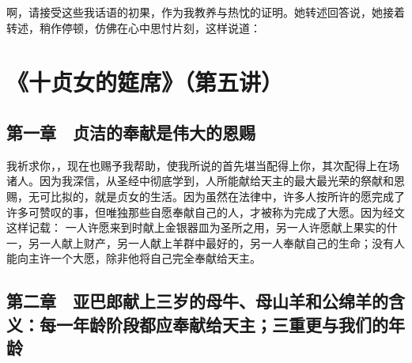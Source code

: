 啊，请接受这些我话语的初果，作为我教养与热忱的证明。\newline{}她转述回答说，她接着转述，稍作停顿，仿佛在心中思忖片刻，这样说道：\newline{}\par



\section{《十贞女的筵席》（第五讲）}

\par


\subsection{第一章　贞洁的奉献是伟大的恩赐}

我祈求你，，现在也赐予我帮助，使我所说的首先堪当配得上你，其次配得上在场诸人。因为我深信，从圣经中彻底学到，人所能献给天主的最大最光荣的祭献和恩赐，无可比拟的，就是贞女的生活。因为虽然在法律中，许多人按所许的愿完成了许多可赞叹的事，但唯独那些自愿奉献自己的人，才被称为完成了大愿。因为经文这样记载： 一人许愿来到时献上金银器皿为圣所之用，另一人许愿献上果实的什一，另一人献上财产，另一人献上羊群中最好的，另一人奉献自己的生命；没有人能向主许一个大愿，除非他将自己完全奉献给天主。\par


\subsection{第二章　亚巴郎献上三岁的母牛、母山羊和公绵羊的含义：每一年龄阶段都应奉献给天主；三重更与我们的年龄}

